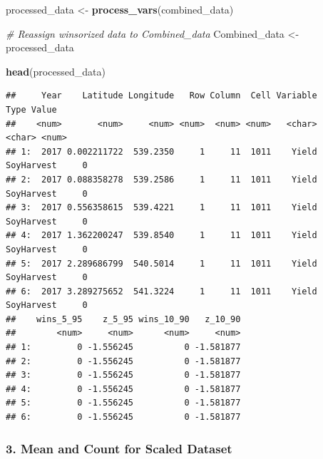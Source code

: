 \documentclass[
]{article}
\newenvironment{Shaded}{\begin{snugshade}}{\end{snugshade}}
\newcommand{\CommentTok}[1]{\textcolor[rgb]{0.56,0.35,0.01}{\textit{#1}}}
\newcommand{\FunctionTok}[1]{\textcolor[rgb]{0.13,0.29,0.53}{\textbf{#1}}}
\newcommand{\NormalTok}[1]{#1}
\newcommand{\OtherTok}[1]{\textcolor[rgb]{0.56,0.35,0.01}{#1}}
\begin{document}
\begin{Shaded}
\begin{Highlighting}[]
\NormalTok{processed\_data }\OtherTok{\textless{}{-}} \FunctionTok{process\_vars}\NormalTok{(combined\_data)}

\CommentTok{\# Reassign winsorized data to Combined\_data}
\NormalTok{Combined\_data  }\OtherTok{\textless{}{-}}\NormalTok{ processed\_data}
\end{Highlighting}
\end{Shaded}

\begin{Shaded}
\begin{Highlighting}[]
\FunctionTok{head}\NormalTok{(processed\_data)}
\end{Highlighting}
\end{Shaded}

\begin{verbatim}
##     Year    Latitude Longitude   Row Column  Cell Variable       Type Value
##    <num>       <num>     <num> <num>  <num> <num>   <char>     <char> <num>
## 1:  2017 0.002211722  539.2350     1     11  1011    Yield SoyHarvest     0
## 2:  2017 0.088358278  539.2586     1     11  1011    Yield SoyHarvest     0
## 3:  2017 0.556358615  539.4221     1     11  1011    Yield SoyHarvest     0
## 4:  2017 1.362200247  539.8540     1     11  1011    Yield SoyHarvest     0
## 5:  2017 2.289686799  540.5014     1     11  1011    Yield SoyHarvest     0
## 6:  2017 3.289275652  541.3224     1     11  1011    Yield SoyHarvest     0
##    wins_5_95    z_5_95 wins_10_90   z_10_90
##        <num>     <num>      <num>     <num>
## 1:         0 -1.556245          0 -1.581877
## 2:         0 -1.556245          0 -1.581877
## 3:         0 -1.556245          0 -1.581877
## 4:         0 -1.556245          0 -1.581877
## 5:         0 -1.556245          0 -1.581877
## 6:         0 -1.556245          0 -1.581877
\end{verbatim}

\subsubsection{3. Mean and Count for Scaled
Dataset}\label{mean-and-count-for-scaled-dataset}
\end{document}
